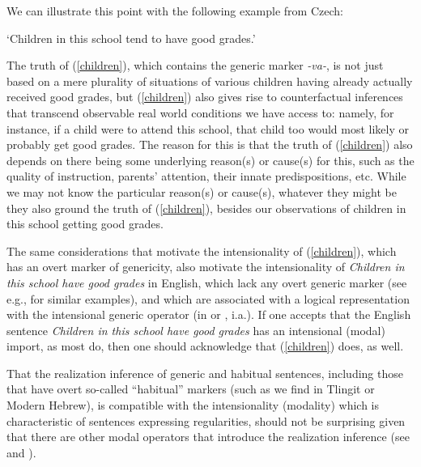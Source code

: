 \documentclass[output=paper,colorlinks,citecolor=brown]{langscibook}
\begin{document}
We can illustrate this point with the following example from Czech:

\glt `Children in this school tend to have good grades.'
\z

\noindent The truth of (\ref{children}), which contains
the generic marker \textit{-va-}, is not just based on a mere
plurality of situations of various children having already actually received
good grades, but (\ref{children})  also
gives rise to counterfactual inferences that transcend observable real world conditions we have access to:
namely, for instance, if a child were to attend this school, that child too would most likely or probably get good grades.
The reason for this is that the truth of (\ref{children}) also
depends on there being some underlying reason(s) or cause(s) for this, such as the quality of instruction, parents' attention, their innate predispositions, etc.  While we may not know the particular reason(s) or cause(s), whatever they might be they also ground the truth of (\ref{children}), besides our observations of children in this school getting good grades.

The same considerations that motivate the intensionality of (\ref{children}), which has an overt marker of genericity, also motivate the intensionality of \textit{Children in this school have good grades} in English, which lack any overt generic marker (see e.g., \citealt{pelletier1997generics} for similar examples),
and which are associated with a logical representation
with the intensional generic operator  (in \citealt{pelletier1997generics} or \citealt{krifka1995genericity}, i.a.).  If one accepts that the English sentence
\textit{Children in this school have good grades} has an intensional (modal) import, as most do, then one should acknowledge that (\ref{children}) does, as well.

That the realization inference of generic and habitual sentences, including those that have overt so-called ``habitual'' markers
(such as we find in Tlingit or Modern Hebrew),
is compatible with the intensionality (modality) which is characteristic of
sentences expressing regularities,
should not be surprising given that there are other modal operators that introduce the realization inference (see \citealt{bhatt1999covert} and \citealt{hacquardDISS}).
\end{document}
